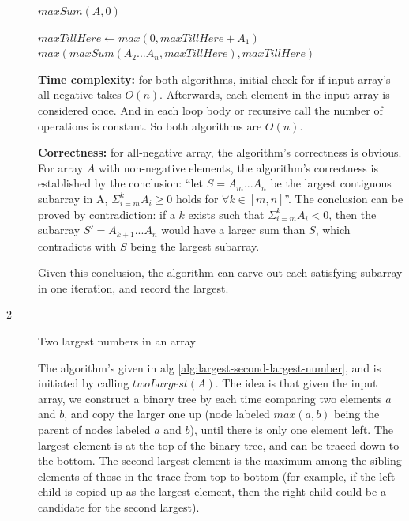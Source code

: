\documentclass{article}
\begin{document}
\begin{description}
\begin{algorithm}[H]
\begin{algorithmic}[1]
      \State $maxSum(A, 0)$
      \State {}
    \EndFunction

        \State {}
      \EndIf
      
      \State $maxTillHere \gets max(0, maxTillHere + A_1)$
      \State \Return $max(maxSum(A_2...A_n, maxTillHere), maxTillHere)$
    \EndFunction
    \end{algorithmic}
  \end{algorithm}

  \textbf{Time complexity:} for both algorithms, initial check for if input array's all negative takes $O(n)$. Afterwards, each element in the input array is considered once. And in each loop body or recursive call the number of operations is constant. So both algorithms are $O(n)$.

  \textbf{Correctness:} for all-negative array, the algorithm's correctness is obvious. For array $A$ with non-negative elements, the algorithm's correctness is established by the conclusion: ``let $S=A_m...A_n$ be the largest contiguous subarray in A, $\Sigma_{i=m}^{k}{A_i} \geq 0$ holds for $\forall k \in [m,n]$''. The conclusion can be proved by contradiction: if a $k$ exists such that $\Sigma_{i=m}^{k}{A_i} < 0$, then the subarray $S'=A_{k+1}...A_n$ would have a larger sum than $S$, which contradicts with $S$ being the largest subarray.

  Given this conclusion, the algorithm can carve out each satisfying subarray in one iteration, and record the largest.


\item[2]{Two largest numbers in an array}
  
  The algorithm's given in alg \ref{alg:largest-second-largest-number}, and is initiated by calling $twoLargest(A)$. The idea is that given the input array, we construct a binary tree by each time comparing two elements $a$ and $b$, and copy the larger one up (node labeled $max(a, b)$ being the parent of nodes labeled $a$ and $b$), until there is only one element left. The largest element is at the top of the binary tree, and can be traced down to the bottom. The second largest element is the maximum among the sibling elements of those in the trace from top to bottom (for example, if the left child is copied up as the largest element, then the right child could be a candidate for the second largest).


\end{description}
\end{document}
